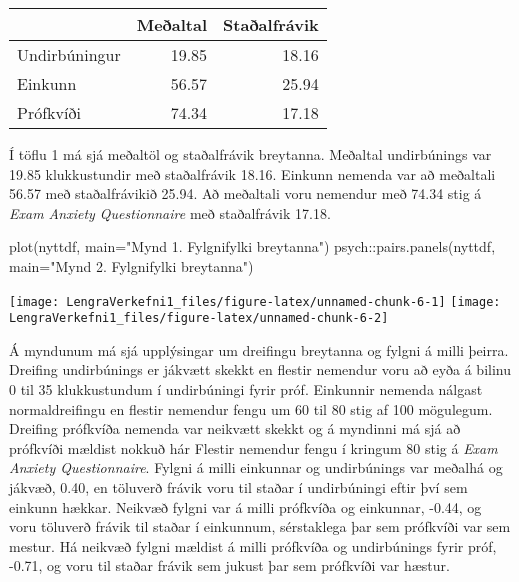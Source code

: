 \documentclass[
]{article}
\newenvironment{Shaded}{\begin{snugshade}}{\end{snugshade}}
\newcommand{\AttributeTok}[1]{\textcolor[rgb]{0.77,0.63,0.00}{#1}}
\newcommand{\FunctionTok}[1]{\textcolor[rgb]{0.00,0.00,0.00}{#1}}
\newcommand{\NormalTok}[1]{#1}
\newcommand{\SpecialCharTok}[1]{\textcolor[rgb]{0.00,0.00,0.00}{#1}}
\newcommand{\StringTok}[1]{\textcolor[rgb]{0.31,0.60,0.02}{#1}}
\begin{document}
\begingroup\fontsize{18}{20}\selectfont

\begin{tabular}[t]{l|r|r}
\hline
  & Meðaltal & Staðalfrávik\\
\hline
Undirbúningur & 19.85 & 18.16\\
\hline
Einkunn & 56.57 & 25.94\\
\hline
Prófkvíði & 74.34 & 17.18\\
\hline
\end{tabular}
\endgroup{}

Í töflu 1 má sjá meðaltöl og staðalfrávik breytanna. Meðaltal
undirbúnings var 19.85 klukkustundir með staðalfrávik 18.16. Einkunn
nemenda var að meðaltali 56.57 með staðalfrávikið 25.94. Að meðaltali
voru nemendur með 74.34 stig á \emph{Exam Anxiety Questionnaire} með
staðalfrávik 17.18.

\begin{Shaded}
\begin{Highlighting}[]
\FunctionTok{plot}\NormalTok{(nyttdf, }\AttributeTok{main=}\StringTok{"Mynd 1. Fylgnifylki breytanna"}\NormalTok{)}
\NormalTok{psych}\SpecialCharTok{::}\FunctionTok{pairs.panels}\NormalTok{(nyttdf, }\AttributeTok{main=}\StringTok{"Mynd 2. Fylgnifylki breytanna"}\NormalTok{)}
\end{Highlighting}
\end{Shaded}

\texttt{[image: LengraVerkefni1\_files/figure-latex/unnamed-chunk-6-1]}
\texttt{[image: LengraVerkefni1\_files/figure-latex/unnamed-chunk-6-2]}

Á myndunum má sjá upplýsingar um dreifingu breytanna og fylgni á milli
þeirra. Dreifing undirbúnings er jákvætt skekkt en flestir nemendur voru
að eyða á bilinu 0 til 35 klukkustundum í undirbúningi fyrir próf.
Einkunnir nemenda nálgast normaldreifingu en flestir nemendur fengu um
60 til 80 stig af 100 mögulegum. Dreifing prófkvíða nemenda var neikvætt
skekkt og á myndinni má sjá að prófkvíði mældist nokkuð hár Flestir
nemendur fengu í kringum 80 stig á \emph{Exam Anxiety Questionnaire}.
Fylgni á milli einkunnar og undirbúnings var meðalhá og jákvæð, 0.40, en
töluverð frávik voru til staðar í undirbúningi eftir því sem einkunn
hækkar. Neikvæð fylgni var á milli prófkvíða og einkunnar, -0.44, og
voru töluverð frávik til staðar í einkunnum, sérstaklega þar sem
prófkvíði var sem mestur. Há neikvæð fylgni mældist á milli prófkvíða og
undirbúnings fyrir próf, -0.71, og voru til staðar frávik sem jukust þar
sem prófkvíði var hæstur.
\end{document}
